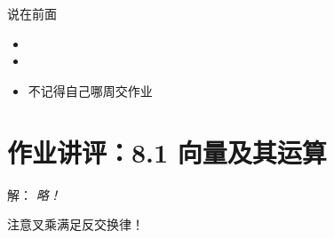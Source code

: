 
\titlepage

\begin{frame}{说在前面}
	\linespread{1.5}
	  \begin{itemize}[<+-|alert@+>]
	    \item {}
	    \item {}
	    \item 不记得自己哪周交作业
	  \end{itemize}
\end{frame}


\section{作业讲评：8.1 向量及其运算}

\begin{frame}
	\linespread{1.5}
	
	\bigskip
	
	\small 解：\it
	略！
	
	\alert{注意叉乘满足反交换律！}
\end{frame}

